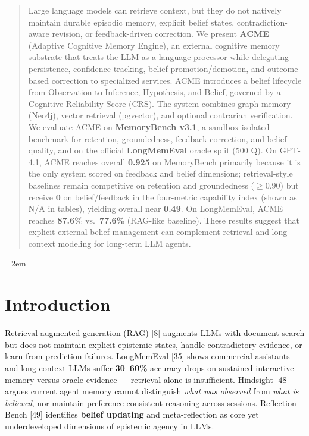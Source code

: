\documentclass[11pt,a4paper]{article}
\begin{document}
\begin{abstract}
Large language models can retrieve context, but they do not natively
maintain durable episodic memory, explicit belief states,
contradiction-aware revision, or feedback-driven correction. We present
\textbf{ACME} (Adaptive Cognitive Memory Engine), an external cognitive
memory substrate that treats the LLM as a language processor while
delegating persistence, confidence tracking, belief promotion/demotion,
and outcome-based correction to specialized services. ACME introduces a
belief lifecycle from Observation to Inference, Hypothesis, and Belief,
governed by a Cognitive Reliability Score (CRS). The system combines
graph memory (Neo4j), vector retrieval (pgvector), and optional
contrarian verification. We evaluate ACME on \textbf{MemoryBench v3.1},
a sandbox-isolated benchmark for retention, groundedness, feedback
correction, and belief quality, and on the official \textbf{LongMemEval}
oracle split (500 Q). On GPT-4.1, ACME reaches overall \textbf{0.925} on
MemoryBench primarily because it is the only system scored on feedback
and belief dimensions; retrieval-style baselines remain competitive on
retention and groundedness (\(\geq 0.90\)) but receive \textbf{0} on
belief/feedback in the four-metric capability index (shown as N/A in
tables), yielding overall near \textbf{0.49}. On LongMemEval, ACME
reaches \textbf{87.6\%} vs.~\textbf{77.6\%} (RAG-like baseline). These
results suggest that explicit external belief management can complement
retrieval and long-context modeling for long-term LLM agents.
\end{abstract}

\twocolumn
\raggedbottom
\emergencystretch=2em

\section{Introduction}\label{introduction}

Retrieval-augmented generation (RAG) {[}8{]} augments LLMs with document
search but does not maintain explicit epistemic states, handle
contradictory evidence, or learn from prediction failures. LongMemEval
{[}35{]} shows commercial assistants and long-context LLMs suffer
\textbf{30--60\%} accuracy drops on sustained interactive memory versus
oracle evidence --- retrieval alone is insufficient. Hindsight {[}48{]}
argues current agent memory cannot distinguish \emph{what was observed}
from \emph{what is believed}, nor maintain preference-consistent
reasoning across sessions. Reflection-Bench {[}49{]} identifies
\textbf{belief updating} and meta-reflection as core yet underdeveloped
dimensions of epistemic agency in LLMs.
\end{document}
